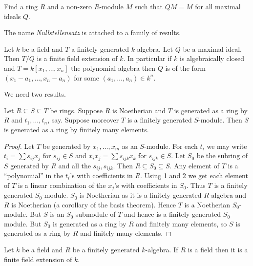 \documentclass[a4paper]{article}
\begin{document}
\begin{ex}
  Find a ring \(R\) and a non-zero \(R\)-module \(M\) such that \(QM = M\) for all maximal ideals \(Q\).
\end{ex}

The name \emph{Nullstellensatz} is attached to a family of results.

\begin{theorem}
  \label{thm:weak Nullstellensatz}
  Let \(k\) be a field and \(T\) a finitely generated \(k\)-algebra. Let \(Q\) be a maximal ideal. Then \(T/Q\) is a finite field extension of \(k\). In particular if \(k\) is algebraically closed and \(T = k[x_1, \dots, x_n]\) the polynomial algebra then \(Q\) is of the form \((x_1 - a_1, \dots, x_n - a_n)\) for some \((a_1, \dots, a_n) \in k^n\).
\end{theorem}

We need two results.

\begin{lemma}
  Let \(R \subseteq S \subseteq T\) be rings. Suppose \(R\) is Noetherian and \(T\) is generated as a ring by \(R\) and \(t_1, \dots, t_n\), say. Suppose moreover \(T\) is a finitely generated \(S\)-module. Then \(S\) is generated as a ring by finitely many elements.
\end{lemma}

\begin{proof}
  Let \(T\) be generated by \(x_1, \dots, x_m\) as an \(S\)-module. For each \(t_i\) we may write \(t_i = \sum s_{ij} x_j\) for \(s_{ij} \in S\) and \(x_ix_j = \sum s_{ijk} x_k\) for \(s_{ijk} \in S\). Let \(S_0\) be the subring of \(S\) generated by \(R\) and all the \(s_{ij}, s_{ijk}\). Then \(R \subseteq S_0 \subseteq S\). Any element of \(T\) is a ``polynomial'' in the \(t_i\)'s with coefficients in \(R\). Using 1 and 2 we get each element of \(T\) is a linear combination of the \(x_j\)'s with coefficients in \(S_0\). Thus \(T\) is a finitely generated \(S_0\)-module. \(S_0\) is Noetherian as it is a finitely generated \(R\)-algebra and \(R\) is Noetherian (a corollary of the basis theorem). Hence \(T\) is a Noetherian \(S_0\)-module. But \(S\) is an \(S_0\)-submodule of \(T\) and hence is a finitely generated \(S_0\)-module. But \(S_0\) is generated as a ring by \(R\) and finitely many elements, so \(S\) is generated as a ring by \(R\) and finitely many elements.
\end{proof}

\begin{proposition}
  \label{prop:field that is fg algebra is a finite extension}
  Let \(k\) be a field and \(R\) be a finitely generated \(k\)-algebra. If \(R\) is a field then it is a finite field extension of \(k\).
\end{proposition}
\end{document}
